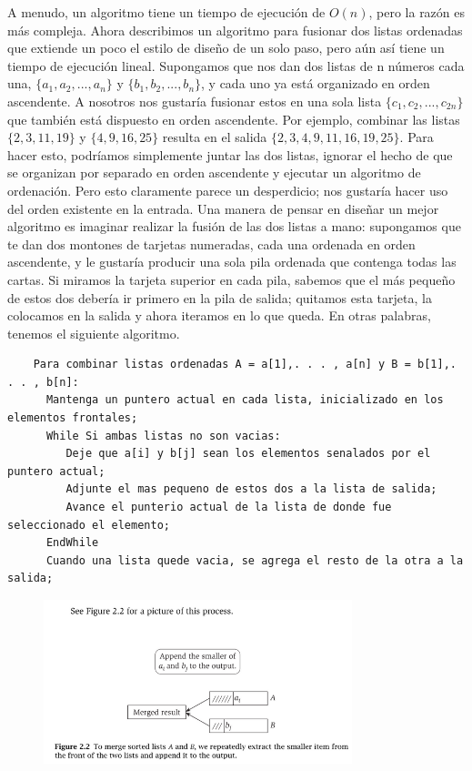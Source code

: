 \documentclass[a4paper, 12pt]{book}
\begin{document}
A menudo, un algoritmo tiene un tiempo de ejecución de $O(n)$, pero la razón es más compleja. Ahora describimos un algoritmo para fusionar dos listas ordenadas que extiende un poco el estilo de diseño de un solo paso, pero aún así tiene un tiempo de ejecución lineal. Supongamos que nos dan dos listas de n números cada una, $ \{a_1, a_2,. . . , a_n\}$ y $\{b_1, b_2,. . . , b_n\}$, y cada uno ya está organizado en orden ascendente. A nosotros nos gustaría fusionar estos en una sola lista $\{c_1, c_2,. . . , c_{2n}\}$ que también está dispuesto en orden ascendente. Por ejemplo, combinar las listas $\{2, 3, 11, 19\}$ y $\{4, 9, 16, 25\}$ resulta en el salida $\{2, 3, 4, 9, 11, 16, 19, 25\}$. Para hacer esto, podríamos simplemente juntar las dos listas, ignorar el hecho de que se organizan por separado en orden ascendente y ejecutar un algoritmo de ordenación. Pero esto claramente parece un desperdicio; nos gustaría hacer uso del orden existente en la entrada. Una manera de pensar en diseñar un mejor algoritmo es imaginar realizar la fusión de las dos listas a mano: supongamos que te dan dos montones de tarjetas numeradas, cada una ordenada en orden ascendente, y le gustaría producir una sola pila ordenada que contenga todas las cartas. Si miramos la tarjeta superior en cada pila, sabemos que el más pequeño de estos dos debería ir primero en la pila de salida; quitamos esta tarjeta, la colocamos en la salida y ahora iteramos en lo que queda. En otras palabras, tenemos el siguiente algoritmo.\\

\begin{lstlisting}
	Para combinar listas ordenadas A = a[1],. . . , a[n] y B = b[1],. . . , b[n]:
      Mantenga un puntero actual en cada lista, inicializado en los elementos frontales;
      While Si ambas listas no son vacias:
         Deje que a[i] y b[j] sean los elementos senalados por el puntero actual;
         Adjunte el mas pequeno de estos dos a la lista de salida;
         Avance el punterio actual de la lista de donde fue seleccionado el elemento;
      EndWhile
      Cuando una lista quede vacia, se agrega el resto de la otra a la salida;
\end{lstlisting}



\begin{figure}[h] 
  \centering
    \includegraphics[width=0.8\textwidth]{Imagenes-Seccion2/fig2_2_real.PNG}
\end{figure}
\end{document}
